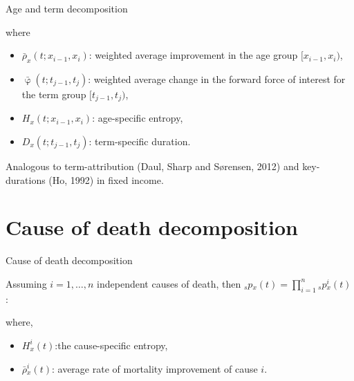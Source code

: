 \documentclass[10pt]{beamer}
\begin{document}
\begin{frame}{Age and term decomposition}

\begin{center}
\pause
\end{center}

where

\begin{itemize}
	\item $\bar{\rho}_x(t;x_{i-1}, x_i)$: weighted average improvement in the age group $[x_{i-1},x_{i})$,
	\item $\bar{\upvarphi}(t;t_{j-1},t_{j})$: weighted average change in the forward force of interest for the term group $[t_{j-1},t_{j})$, \pause
	\item ${H}_x(t;x_{i-1}, x_i)$: age-specific entropy,
	\item ${D}_x(t;t_{j-1},t_{j})$: term-specific duration. \pause
\end{itemize}


Analogous to term-attribution (Daul, Sharp and S\o rensen, 2012) and key-durations (Ho, 1992) in fixed income.



\end{frame}





\section{Cause of death decomposition}

\begin{frame}{Cause of death decomposition}

Assuming $i=1,\dots,n$ independent causes of death, then ${_s}p{_x}(t)= \prod_{i=1}^{n} {_s}p{^i_x}(t)$: \pause



\begin{center}
	\pause
\end{center}


where,
\begin{itemize}
	
	\item ${H}^{i}_x(t)$:the cause-specific entropy,
	\item $\bar{\rho}{^i_x}(t)$: average rate of mortality improvement of cause $i$.
\end{itemize}
\end{frame}
\end{document}
